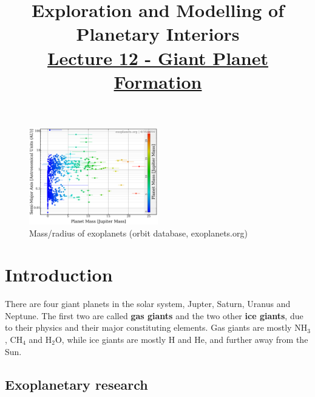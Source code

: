 \documentclass[12pt]{article} %
\title{\large{\vspace{-5ex}\textbf{Exploration and Modelling of Planetary Interiors}}\newline\\{\textbf{\underline{Lecture 12 - Giant Planet Formation}}}\vspace{-7ex}}
\author{}
\date{} %
\begin{document}
\begingroup
\let\center\flushleft
\let\endcenter\endflushleft
\maketitle
\endgroup

\begingroup
\let\cleardoublepage\relax
\let\clearpage\relax
\tableofcontents
\endgroup

\begin{figure}
\begin{center}
 \includegraphics[width=0.5\textwidth,keepaspectratio=true]{./images/exoplanets}
 \caption{Mass/radius of exoplanets (orbit database, exoplanets.org)}
 \label{exoplanets}
\end{center}
\end{figure}


\section{Introduction}\vspace{-2ex}\titlerule[1pt]\bigskip

There are four giant planets in the solar system, Jupter, Saturn, Uranus and Neptune. The first two are called \textbf{gas giants} and the two other \textbf{ice giants}, due to their physics and their major constituting elements. Gas giants are mostly NH$_3$, CH$_4$ and H$_2$O, while ice giants are mostly H and He, and further away from the Sun.

\subsection{Exoplanetary research}\vspace{-1ex}\bigskip
\end{document}

